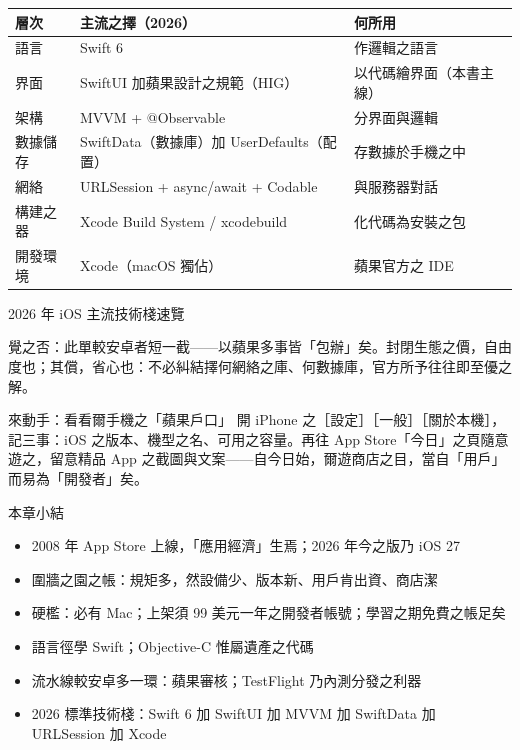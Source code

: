 
\begin{center}
\begin{tabularx}{\linewidth}{|X|X|X|}
\hline
\textbf{層次} & \textbf{主流之擇（2026）} & \textbf{何所用} \tabularnewline
\hline
語言 & Swift 6 & 作邏輯之語言 \tabularnewline
界面 & SwiftUI 加蘋果設計之規範（HIG） & 以代碼繪界面（本書主線） \tabularnewline
架構 & MVVM + @Observable & 分界面與邏輯 \tabularnewline
數據儲存 & SwiftData（數據庫）加 UserDefaults（配置） & 存數據於手機之中 \tabularnewline
網絡 & URLSession + async/await + Codable & 與服務器對話 \tabularnewline
構建之器 & Xcode Build System / xcodebuild & 化代碼為安裝之包 \tabularnewline
開發環境 & Xcode（macOS 獨佔） & 蘋果官方之 IDE \tabularnewline
\hline
\end{tabularx}
\end{center}

\begin{center}\small\color{gray}2026 年 iOS 主流技術棧速覽\end{center}

覺之否：此單較安卓者短一截——以蘋果多事皆「包辦」矣。封閉生態之價，自由度也；其償，省心也：不必糾結擇何網絡之庫、何數據庫，官方所予往往即至優之解。

\begin{tcbpractice}{來動手：看看爾手機之「蘋果戶口」}
開 iPhone 之［設定］［一般］［關於本機］，記三事：iOS 之版本、機型之名、可用之容量。再往 App Store「今日」之頁隨意遊之，留意精品 App 之截圖與文案——自今日始，爾遊商店之目，當自「用戶」而易為「開發者」矣。

\end{tcbpractice}

\begin{tcbsummary}{本章小結}
\begin{itemize}
  \item 2008 年 App Store 上線，「應用經濟」生焉；2026 年今之版乃 iOS 27
  \item 圍牆之園之帳：規矩多，然設備少、版本新、用戶肯出資、商店潔
  \item 硬檻：必有 Mac；上架須 99 美元一年之開發者帳號；學習之期免費之帳足矣
  \item 語言徑學 Swift；Objective-C 惟屬遺產之代碼
  \item 流水線較安卓多一環：蘋果審核；TestFlight 乃內測分發之利器
  \item 2026 標準技術棧：Swift 6 加 SwiftUI 加 MVVM 加 SwiftData 加 URLSession 加 Xcode
\end{itemize}

\end{tcbsummary}
